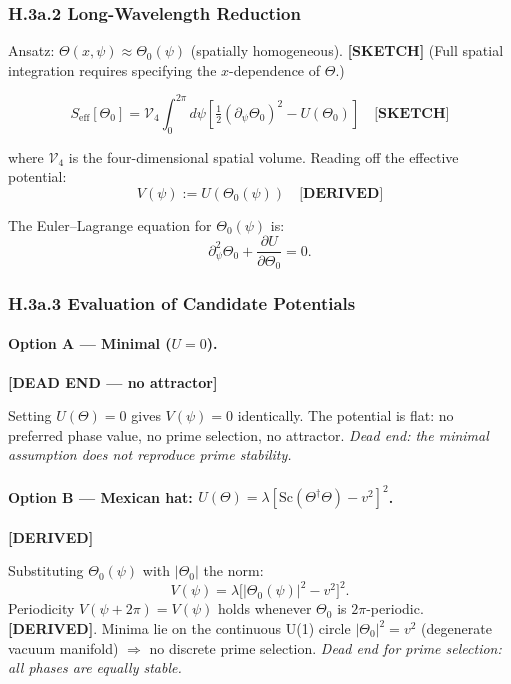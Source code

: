 \subsubsection*{H.3a.2 Long-Wavelength Reduction}

Ansatz: $\Theta(x,\psi) \approx \Theta_0(\psi)$ (spatially homogeneous). \textbf{[SKETCH]}
(Full spatial integration requires specifying the $x$-dependence of $\Theta$.)

\begin{equation}\label{eq:Seff}
S_\mathrm{eff}[\Theta_0] = \mathcal{V}_4 \int_0^{2\pi} d\psi
  \left[ \tfrac{1}{2}(\partial_\psi \Theta_0)^2 - U(\Theta_0) \right]
  \quad \textbf{[SKETCH]}
\end{equation}

where $\mathcal{V}_4$ is the four-dimensional spatial volume. Reading off the effective
potential:
\begin{equation}\label{eq:Vpsi_def}
V(\psi) := U(\Theta_0(\psi))   \quad \textbf{[DERIVED]}
\end{equation}

The Euler--Lagrange equation for $\Theta_0(\psi)$ is:
\begin{equation}
\partial^2_\psi \Theta_0 + \frac{\partial U}{\partial \Theta_0} = 0.
  \label{eq:EL_Theta0}
\end{equation}

\subsubsection*{H.3a.3 Evaluation of Candidate Potentials}

\paragraph{Option A — Minimal ($U=0$).}  \hfill \textbf{[DEAD END — no attractor]}

Setting $U(\Theta)=0$ gives $V(\psi)=0$ identically.
The potential is flat: no preferred phase value, no prime selection, no attractor.
\textit{Dead end: the minimal assumption does not reproduce prime stability.}

\paragraph{Option B — Mexican hat: $U(\Theta)=\lambda[\mathrm{Sc}(\Theta^\dagger\Theta)-v^2]^2$.}
\hfill \textbf{[DERIVED]}

Substituting $\Theta_0(\psi)$ with $|\Theta_0|$ the norm:
\begin{equation}
V(\psi) = \lambda\bigl[|\Theta_0(\psi)|^2 - v^2\bigr]^2. \label{eq:V_mex_hat}
\end{equation}
Periodicity $V(\psi+2\pi)=V(\psi)$ holds whenever $\Theta_0$ is $2\pi$-periodic.
\textbf{[DERIVED]}. Minima lie on the continuous U(1) circle $|\Theta_0|^2=v^2$
(degenerate vacuum manifold) $\Rightarrow$ no discrete prime selection.
\textit{Dead end for prime selection: all phases are equally stable.}

